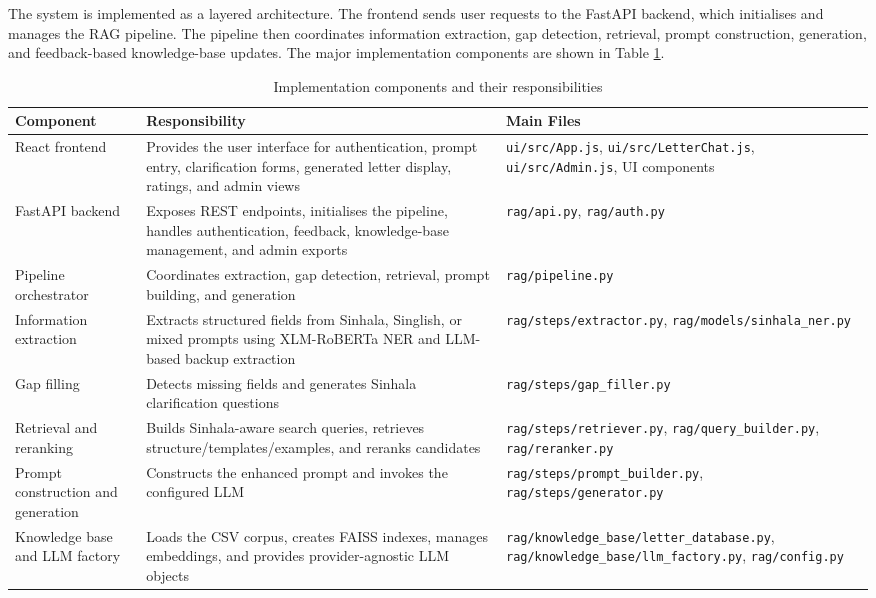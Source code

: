 \documentclass[12pt]{uomthesis}
\begin{document}
The system is implemented as a layered architecture. The frontend sends user requests to the FastAPI backend, which initialises and manages the RAG pipeline. The pipeline then coordinates information extraction, gap detection, retrieval, prompt construction, generation, and feedback-based knowledge-base updates. The major implementation components are shown in Table \ref{tab:implementation_components}.

\begin{table}[h!]
\centering
\small
\begin{tabularx}{\linewidth}{@{}p{4.2cm}Xp{4.1cm}@{}}
\toprule
\textbf{Component} & \textbf{Responsibility} & \textbf{Main Files} \\
\midrule
React frontend & Provides the user interface for authentication, prompt entry, clarification forms, generated letter display, ratings, and admin views & \texttt{ui/src/App.js}, \texttt{ui/src/LetterChat.js}, \texttt{ui/src/Admin.js}, UI components \\
\addlinespace
FastAPI backend & Exposes REST endpoints, initialises the pipeline, handles authentication, feedback, knowledge-base management, and admin exports & \texttt{rag/api.py}, \texttt{rag/auth.py} \\
\addlinespace
Pipeline orchestrator & Coordinates extraction, gap detection, retrieval, prompt building, and generation & \texttt{rag/pipeline.py} \\
\addlinespace
Information extraction & Extracts structured fields from Sinhala, Singlish, or mixed prompts using XLM-RoBERTa NER and LLM-based backup extraction & \texttt{rag/steps/extractor.py}, \texttt{rag/models/sinhala\_ner.py} \\
\addlinespace
Gap filling & Detects missing fields and generates Sinhala clarification questions & \texttt{rag/steps/gap\_filler.py} \\
\addlinespace
Retrieval and reranking & Builds Sinhala-aware search queries, retrieves structure/templates/examples, and reranks candidates & \texttt{rag/steps/retriever.py}, \texttt{rag/query\_builder.py}, \texttt{rag/reranker.py} \\
\addlinespace
Prompt construction and generation & Constructs the enhanced prompt and invokes the configured LLM & \texttt{rag/steps/prompt\_builder.py}, \texttt{rag/steps/generator.py} \\
\addlinespace
Knowledge base and LLM factory & Loads the CSV corpus, creates FAISS indexes, manages embeddings, and provides provider-agnostic LLM objects & \texttt{rag/knowledge\_base/letter\_database.py}, \texttt{rag/knowledge\_base/llm\_factory.py}, \texttt{rag/config.py} \\
\bottomrule
\end{tabularx}
\caption{Implementation components and their responsibilities}
\label{tab:implementation_components}
\end{table}
\end{document}
